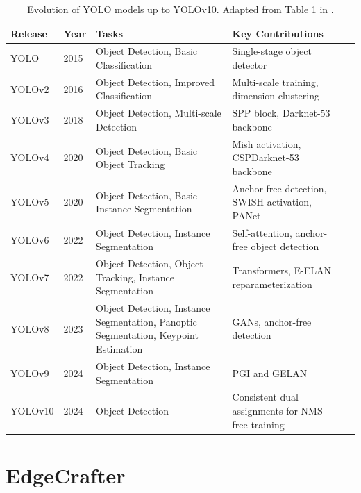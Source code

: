 \begin{table}[htbp]
    \centering
    \begin{tabular}{p{1.6cm}p{0.9cm}p{4.2cm}p{4.5cm}p{1.6cm}}
\hline \textbf{Release} & \textbf{Year} & \textbf{Tasks} & \textbf{Key Contributions} \\ \hline YOLO & 2015 & Object Detection, Basic Classification & Single-stage object detector \\ YOLOv2 & 2016 & Object Detection, Improved Classification & Multi-scale training, dimension clustering \\ YOLOv3 & 2018 & Object Detection, Multi-scale Detection & SPP block, Darknet-53 backbone \\ YOLOv4 & 2020 & Object Detection, Basic Object Tracking & Mish activation, CSPDarknet-53 backbone \\ YOLOv5 & 2020 & Object Detection, Basic Instance Segmentation & Anchor-free detection, SWISH activation, PANet \\ YOLOv6 & 2022 & Object Detection, Instance Segmentation & Self-attention, anchor-free object detection \\ YOLOv7 & 2022 & Object Detection, Object Tracking, Instance Segmentation & Transformers, E-ELAN reparameterization \\ YOLOv8 & 2023 & Object Detection, Instance Segmentation, Panoptic Segmentation, Keypoint Estimation & GANs, anchor-free detection \\ YOLOv9 & 2024 & Object Detection, Instance Segmentation & PGI and GELAN \\ YOLOv10 & 2024 & Object Detection & Consistent dual assignments for NMS-free training
\\ \hline 
    \end{tabular}
    \caption{Evolution of YOLO models up to YOLOv10. Adapted from Table 1 in \cite{yolov11}.}
    \label{tab:yolo_evolution} \footnotesize
\end{table}



\section{EdgeCrafter}
\label{related_work_edgecrafter}

